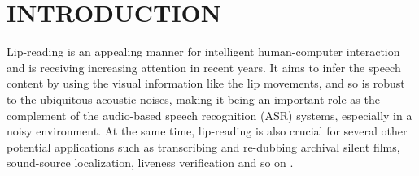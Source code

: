 \documentclass[a4paper, 10pt, conference]{ieeeconf}      %
\begin{document}
\section{INTRODUCTION}
Lip-reading is an appealing manner for intelligent human-computer interaction and is receiving increasing attention in recent years. It aims to infer the speech content by using the visual information \cite{B2017} like the lip movements, and so is robust to the ubiquitous acoustic noises, making it being an important role as the complement of the audio-based speech recognition (ASR) systems, especially in a noisy environment. At the same time, lip-reading is also crucial for several other potential applications such as transcribing and re-dubbing archival silent films, sound-source localization, liveness verification and so on \cite{Chung}. 
\end{document}

